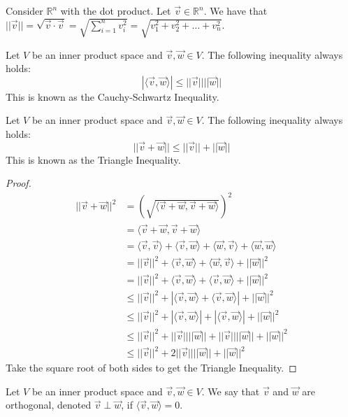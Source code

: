 \begin{example}
    Consider $\mathbb{R}^n$ with the dot product. Let $\vec{v}\in\mathbb{R}^n$. We have that $||\vec{v}||=\sqrt{\vec{v}\cdot\vec{v}}=\sqrt{\sum_{i=1}^n v_i^2}=\sqrt{v_1^2+v_2^2+\ldots+v_n^2}$.
\end{example}
\begin{theorem}
    Let $V$ be an inner product space and $\vec{v},\vec{w}\in V$. The following inequality always holds:
    $$|\langle\vec{v},\vec{w}\rangle|\leq||\vec{v}||||\vec{w}||$$
    This is known as the Cauchy-Schwartz Inequality.
\end{theorem}
\begin{theorem}
    Let $V$ be an inner product space and $\vec{v},\vec{w}\in V$. The following inequality always holds:
    $$||\vec{v}+\vec{w}||\leq||\vec{v}||+||\vec{w}||$$
    This is known as the Triangle Inequality.
\end{theorem}
\begin{proof}
    \begin{align*}
        ||\vec{v}+\vec{w}||^2&=(\sqrt{\langle\vec{v}+\vec{w},\vec{v}+\vec{w}\rangle})^2\\
        &=\langle\vec{v}+\vec{w},\vec{v}+\vec{w}\rangle\\
        &=\langle\vec{v},\vec{v}\rangle+\langle\vec{v},\vec{w}\rangle+\langle\vec{w},\vec{v}\rangle+\langle\vec{w},\vec{w}\rangle\tag{by Linearity of Inner Product}\\
        &=||\vec{v}||^2+\langle\vec{v},\vec{w}\rangle+\langle\vec{w},\vec{v}\rangle+||\vec{w}||^2\\
        &=||\vec{v}||^2+\langle\vec{v},\vec{w}\rangle+\langle\vec{v},\vec{w}\rangle+||\vec{w}||^2\tag{by Symmetry of Inner Product}\\
        &\leq||\vec{v}||^2+|\langle\vec{v},\vec{w}\rangle+\langle\vec{v},\vec{w}\rangle|+||\vec{w}||^2\\
        &\leq||\vec{v}||^2+|\langle\vec{v},\vec{w}\rangle|+|\langle\vec{v},\vec{w}\rangle|+||\vec{w}||^2\\
        &\leq||\vec{v}||^2+||\vec{v}||||\vec{w}||+||\vec{v}||||\vec{w}||+||\vec{w}||^2\tag{by Cauchy Schwartz Inequality}\\
        &\leq||\vec{v}||^2+2||\vec{v}||||\vec{w}||+||\vec{w}||^2
    \end{align*}
    Take the square root of both sides to get the Triangle Inequality.
\end{proof}
\begin{definition}
    Let $V$ be an inner product space and $\vec{v},\vec{w}\in V$. We say that $\vec{v}$ and $\vec{w}$ are orthogonal, denoted $\vec{v}\perp\vec{w}$, if $\langle\vec{v},\vec{w}\rangle=0$.
\end{definition}
